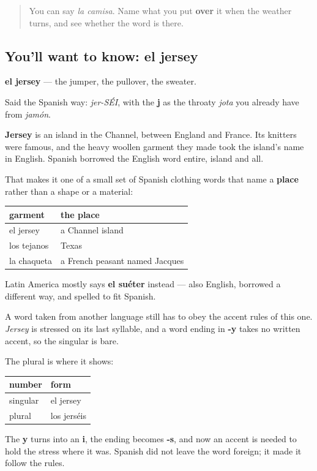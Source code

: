\label{lesson:ES-C430-jersey}



\begin{quote}
You can say \emph{la camisa}. Name what you put \textbf{over} it when the weather turns, and see whether the word is there.
\end{quote}

\subsection*{You'll want to know: el jersey}
\textbf{el jersey} — the jumper, the pullover, the sweater.

Said the Spanish way: \emph{jer-SÉI}, with the \textbf{j} as the throaty \emph{jota} you already have from \emph{jamón}.

\begin{cousinweb}
\textbf{Jersey} is an island in the Channel, between England and France. Its knitters were famous, and the heavy woollen garment they made took the island's name in English. Spanish borrowed the English word entire, island and all.

That makes it one of a small set of Spanish clothing words that name a \textbf{place} rather than a shape or a material:

\noindent
\begin{tabularx}{\linewidth}{@{}>{\raggedright\arraybackslash}X>{\raggedright\arraybackslash}X@{}}
\toprule
\textbf{garment} & \textbf{the place} \\
\midrule
el jersey & a Channel island \\
los tejanos & Texas \\
la chaqueta & a French peasant named Jacques \\
\bottomrule
\end{tabularx}

Latin America mostly says \textbf{el suéter} instead — also English, borrowed a different way, and spelled to fit Spanish.
\end{cousinweb}

\begin{grammarlens}[title={Grammar Lens: what a borrowed word has to learn}]
A word taken from another language still has to obey the accent rules of this one. \emph{Jersey} is stressed on its last syllable, and a word ending in \textbf{-y} takes no written accent, so the singular is bare.

The plural is where it shows:

\noindent
\begin{tabularx}{\linewidth}{@{}>{\raggedright\arraybackslash}X>{\raggedright\arraybackslash}X@{}}
\toprule
\textbf{number} & \textbf{form} \\
\midrule
singular & el jersey \\
plural & los jerséis \\
\bottomrule
\end{tabularx}

The \textbf{y} turns into an \textbf{i}, the ending becomes \textbf{-s}, and now an accent is needed to hold the stress where it was. Spanish did not leave the word foreign; it made it follow the rules.
\end{grammarlens}

